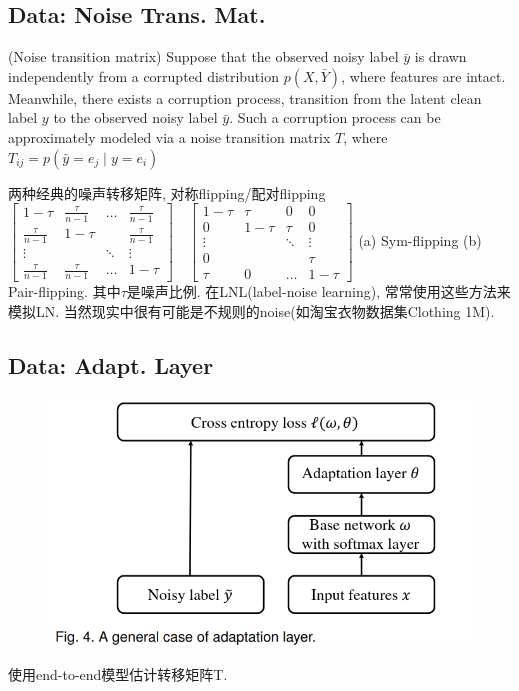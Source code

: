 \documentclass{article}
\begin{document}
\subsection{Data: Noise Trans. Mat.}

\begin{definition}
    (Noise transition matrix) Suppose that the observed noisy label $\bar{y}$ is drawn independently from a corrupted distribution $p(X, \bar{Y})$, where features are intact. Meanwhile, there exists a corruption process, transition from the latent clean label $y$ to the observed noisy label $\bar{y}$. Such a corruption process can be approximately modeled via a noise transition matrix $T$, where $T_{i j}=p\left(\bar{y}=e_{j} \mid y=e_{i}\right)$
\end{definition}

两种经典的噪声转移矩阵, 对称flipping/配对flipping
$\left[\begin{array}{cccc}1-\tau & \frac{\tau}{n-1} & \ldots & \frac{\tau}{n-1} \\ \frac{\tau}{n-1} & 1-\tau & & \frac{\tau}{n-1} \\ \vdots & & \ddots & \vdots \\ \frac{\tau}{n-1} & \frac{\tau}{n-1} & \ldots & 1-\tau\end{array}\right] \quad\left[\begin{array}{cccc}1-\tau & \tau & 0 & 0 \\ 0 & 1-\tau & \tau & 0 \\ \vdots & & \ddots & \vdots \\ 0 & & & \tau \\ \tau & 0 & \ldots & 1-\tau\end{array}\right]$
(a) Sym-flipping
(b) Pair-flipping.
其中$\tau$是噪声比例. 
在LNL(label-noise learning), 常常使用这些方法来模拟LN. 当然现实中很有可能是不规则的noise(如淘宝衣物数据集Clothing 1M).

\subsection{Data: Adapt. Layer}

\begin{figure}[htbp]
    \centering
    \includegraphics[width=\textwidth]{lnrl-adapt.png}
\end{figure}
使用end-to-end模型估计转移矩阵T.
\end{document}
